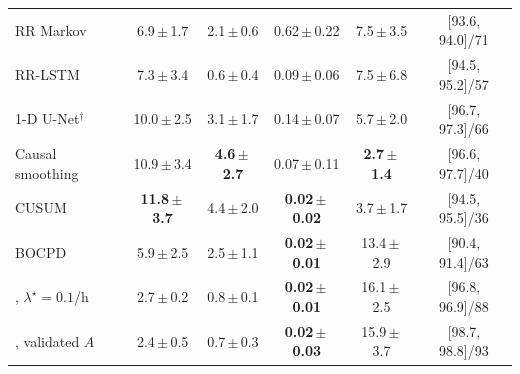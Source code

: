 \begin{table}[!htbp]
{\begin{tabular}{@{}lccccc@{}}
RR Markov & 6.9\,$\pm$\,1.7 & 2.1\,$\pm$\,0.6 & 0.62\,$\pm$\,0.22 & 7.5\,$\pm$\,3.5 & [93.6, 94.0]/71\\
RR-LSTM & 7.3\,$\pm$\,3.4 & 0.6\,$\pm$\,0.4 & 0.09\,$\pm$\,0.06 & 7.5\,$\pm$\,6.8 & [94.5, 95.2]/57\\
1-D U-Net$^\dagger$ & 10.0\,$\pm$\,2.5 & 3.1\,$\pm$\,1.7 & 0.14\,$\pm$\,0.07 & 5.7\,$\pm$\,2.0 & [96.7, 97.3]/66\\
Causal smoothing & 10.9\,$\pm$\,3.4 & \textbf{4.6\,$\pm$\,2.7} & 0.07\,$\pm$\,0.11 & \textbf{2.7\,$\pm$\,1.4} & [96.6, 97.7]/40\\
CUSUM & \textbf{11.8\,$\pm$\,3.7} & 4.4\,$\pm$\,2.0 & \textbf{0.02\,$\pm$\,0.02} & 3.7\,$\pm$\,1.7 & [94.5, 95.5]/36\\
BOCPD & 5.9\,$\pm$\,2.5 & 2.5\,$\pm$\,1.1 & \textbf{0.02\,$\pm$\,0.01} & 13.4\,$\pm$\,2.9 & [90.4, 91.4]/63\\
\method{}, $\lambda^\star=0.1$/h & 2.7\,$\pm$\,0.2 & 0.8\,$\pm$\,0.1 & \textbf{0.02\,$\pm$\,0.01} & 16.1\,$\pm$\,2.5 & [96.8, 96.9]/88\\
\method{}, validated $A$ & 2.4\,$\pm$\,0.5 & 0.7\,$\pm$\,0.3 & \textbf{0.02\,$\pm$\,0.03} & 15.9\,$\pm$\,3.7 & [98.7, 98.8]/93\\
\bottomrule
\end{tabular}}
\end{table}
